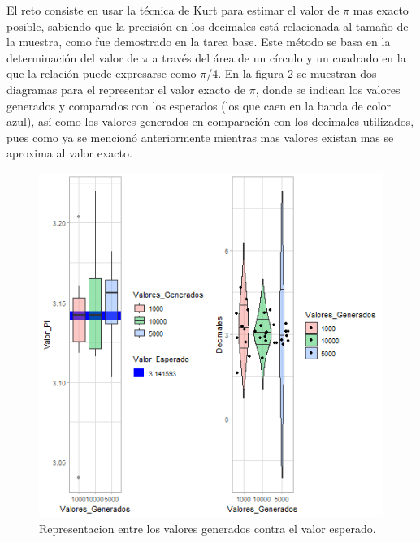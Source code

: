 \documentclass{article}
\begin{document}
El reto consiste en usar la t\'ecnica de Kurt \cite{kurt} para estimar el valor de $\pi$ mas exacto posible, sabiendo que la precisi\'on en los decimales est\'a relacionada al tama\~no de la muestra, como fue demostrado en la tarea base. Este m\'etodo se basa en la determinaci\'on del valor de $\pi$ a trav\'es del \'area de un c\'irculo y un cuadrado en la que la relaci\'on puede expresarse como $\pi$/4. En la figura 2 se muestran dos diagramas para el representar el valor exacto de $\pi$, donde se indican los valores generados y comparados con los esperados (los que caen en la banda de color azul), as\'i como los valores generados en comparaci\'on con los decimales utilizados, pues como ya se mencion\'o anteriormente mientras mas valores existan mas se aproxima al valor exacto. 

\begin{figure}
  \centering\includegraphics[scale=0.6]{Grafica2.png}
  \caption{Representacion entre los valores generados contra el valor esperado.}
  \label{fig}
\end{figure}

\newpage


\end{document}
